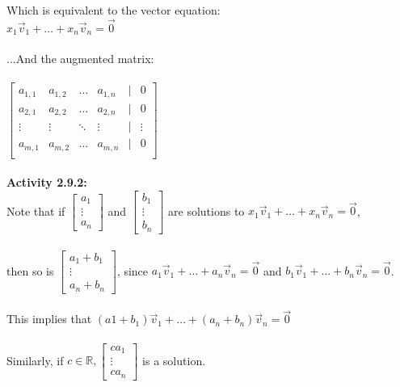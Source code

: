 \documentclass{article}
\begin{document}
\\
\\
Which is equivalent to the vector equation:\\
$x_{1}\vec{v}_{1} + \dots + x_{n}\vec{v}_{n}= \vec{0}$\\
\\
...And the augmented matrix:\\
\\
$\left[ \begin{matrix} 
a_{1,1} & a_{1,2} & \dots & a_{1,n} &|& 0\\
a_{2,1} & a_{2,2} & \dots & a_{2,n} &|& 0\\
\vdots & \vdots & \ddots & \vdots &|& \vdots\\
a_{m,1} & a_{m,2} & \dots & a_{m,n} &|& 0\\
\end{matrix}\right]$\\
\\
\textbf{Activity 2.9.2:} \\
Note that if 
$\left[ \begin{matrix} a_{1} \\ \vdots \\ a_{n} \end{matrix}\right]$ and 
$\left[ \begin{matrix} b_{1} \\ \vdots \\ b_{n} \end{matrix}\right]$ are solutions to $x_{1}\vec{v}_{1} + \dots + x_{n}\vec{v}_{n}= \vec{0}$,\\
\\
then so is $\left[ \begin{matrix} a_{1} + b_{1} \\ \vdots \\ a_{n} + b_{n} \end{matrix}\right]$, since $a_{1}\vec{v}_{1} + \dots + a_{n}\vec{v}_{n}= \vec{0}$ and $b_{1}\vec{v}_{1} + \dots + b_{n}\vec{v}_{n}= \vec{0}$.\\
\\
This implies that $(a{1} + b_{1})\vec{v}_{1} + \dots + (a_{n} + b_{n})\vec{v}_{n} = \vec{0}$\\
\\
Similarly, if $c \in \mathbb{R}, \left[ \begin{matrix} ca_{1}\\ \vdots \\ ca_{n} \end{matrix} \right]$ is a solution. \\
\end{document}
